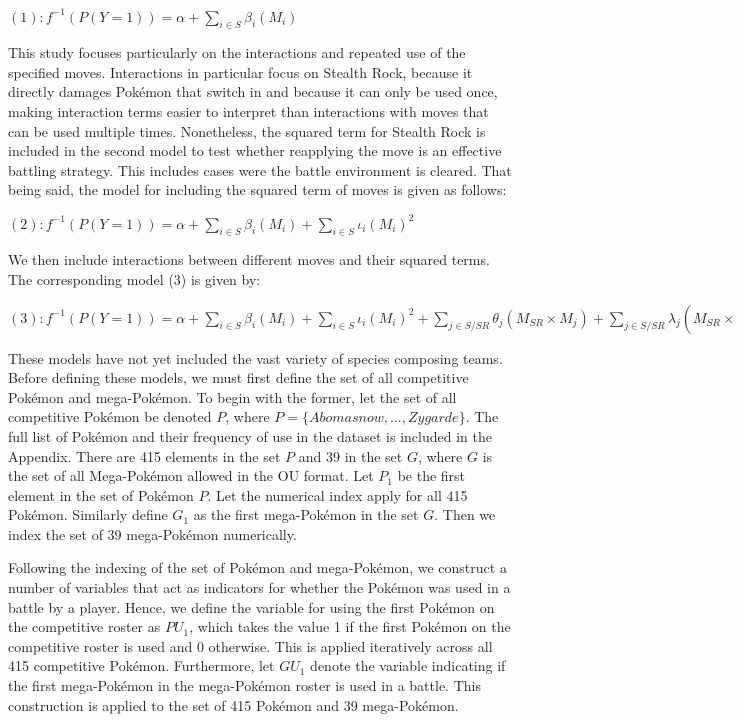 \documentclass[12pt,twoside]{reedthesis}
\begin{document}
  \((1): f^{-1}(P(Y=1)) = \alpha + \sum_{i \in S} \beta_i(M_i)\)
  
  This study focuses particularly on the interactions and repeated use of
  the specified moves. Interactions in particular focus on Stealth Rock,
  because it directly damages Pokémon that switch in and because it can
  only be used once, making interaction terms easier to interpret than
  interactions with moves that can be used multiple times. Nonetheless,
  the squared term for Stealth Rock is included in the second model to
  test whether reapplying the move is an effective battling strategy. This
  includes cases were the battle environment is cleared. That being said,
  the model for including the squared term of moves is given as follows:
  
  \((2): f^{-1}(P(Y=1)) = \alpha + \sum_{i \in S} \beta_i(M_i) + \sum_{i \in S} \iota_i(M_i)^2\)
  
  We then include interactions between different moves and their squared
  terms. The corresponding model (3) is given by:
  
  \((3): f^{-1}(P(Y=1)) = \alpha + \sum_{i \in S} \beta_i(M_i) + \sum_{i \in S} \iota_i(M_i)^2 + \sum_{j \in S/{SR}} \theta_j(M_{SR} \times M_j) + \sum_{j \in S/{SR}} \lambda_j(M_{SR} \times (M_j)^2)\)
  
  These models have not yet included the vast variety of species composing
  teams. Before defining these models, we must first define the set of all
  competitive Pokémon and mega-Pokémon. To begin with the former, let the
  set of all competitive Pokémon be denoted \(P\), where
  \(P=\{Abomasnow,...,Zygarde\}\). The full list of Pokémon and their
  frequency of use in the dataset is included in the Appendix. There are
  415 elements in the set \(P\) and 39 in the set \(G\), where \(G\) is
  the set of all Mega-Pokémon allowed in the OU format. Let \(P_1\) be the
  first element in the set of Pokémon \(P\). Let the numerical index apply
  for all 415 Pokémon. Similarly define \(G_1\) as the first mega-Pokémon
  in the set \(G\). Then we index the set of 39 mega-Pokémon numerically.
  
  Following the indexing of the set of Pokémon and mega-Pokémon, we
  construct a number of variables that act as indicators for whether the
  Pokémon was used in a battle by a player. Hence, we define the variable
  for using the first Pokémon on the competitive roster as \(PU_1\), which
  takes the value 1 if the first Pokémon on the competitive roster is used
  and 0 otherwise. This is applied iteratively across all 415 competitive
  Pokémon. Furthermore, let \(GU_1\) denote the variable indicating if the
  first mega-Pokémon in the mega-Pokémon roster is used in a battle. This
  construction is applied to the set of 415 Pokémon and 39 mega-Pokémon.
  
\end{document}

